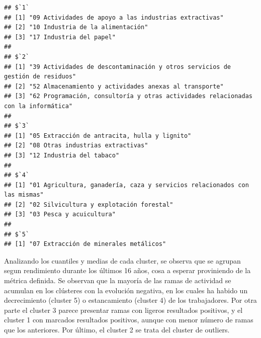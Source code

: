 \documentclass[notspecified,article,submit,moreauthors,pdftex]{Definitions/mdpi}
\begin{document}
\begin{verbatim}
## $`1`
## [1] "09 Actividades de apoyo a las industrias extractivas"
## [2] "10 Industria de la alimentación"                     
## [3] "17 Industria del papel"                              
## 
## $`2`
## [1] "39 Actividades de descontaminación y otros servicios de gestión de residuos"     
## [2] "52 Almacenamiento y actividades anexas al transporte"                            
## [3] "62 Programación, consultoría y otras actividades relacionadas con la informática"
## 
## $`3`
## [1] "05 Extracción de antracita, hulla y lignito"
## [2] "08 Otras industrias extractivas"            
## [3] "12 Industria del tabaco"                    
## 
## $`4`
## [1] "01 Agricultura, ganadería, caza y servicios relacionados con las mismas"
## [2] "02 Silvicultura y explotación forestal"                                 
## [3] "03 Pesca y acuicultura"                                                 
## 
## $`5`
## [1] "07 Extracción de minerales metálicos"
\end{verbatim}

Analizando los cuantiles y medias de cada cluster, se observa que se
agrupan segun rendimiento durante los últimos 16 años, cosa a esperar
proviniendo de la métrica definida. Se observan que la mayoría de las
ramas de actividad se acumulan en los clústeres con la evolución
negativa, en los cuales ha habido un decrecimiento (cluster 5) o
estancamiento (cluster 4) de los trabajadores. Por otra parte el cluster
3 parece presentar ramas con ligeros resultados positivos, y el cluster
1 con marcados resultados positivos, aunque con menor número de ramas
que los anteriores. Por último, el cluster 2 se trata del cluster de
outliers.


\vspace{6pt}



\end{document}

